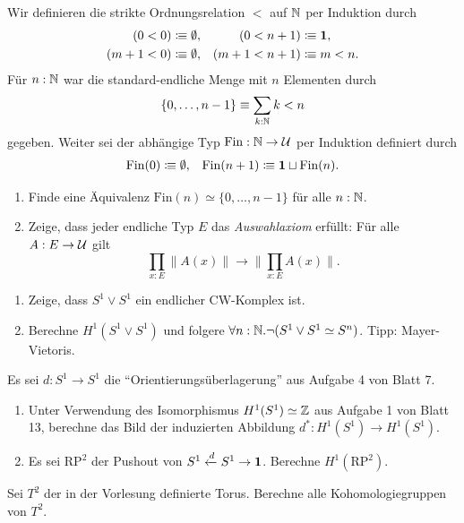 \documentclass{hott-übung}
\begin{document}
\setcounter{blattnummer}{14}
\setcounter{aufgabennummer}{0}

\blatt

\aufgabe{}
Wir definieren die strikte Ordnungsrelation \(<\) auf \(\mathbb{N}\) per Induktion durch
\begin{align*}
  (0 < 0) &\vcentcolon\mspace{-1.2mu}\equiv \emptyset, & (0 < n + 1) &\vcentcolon\mspace{-1.2mu}\equiv \mathbf{1}, \\
  (m + 1 < 0) &\vcentcolon\mspace{-1.2mu}\equiv \emptyset, & (m + 1 < n + 1) &\vcentcolon\mspace{-1.2mu}\equiv m < n.
\end{align*}
Für \(n : \mathbb{N}\) war die standard-endliche Menge mit \(n\) Elementen durch
\[\{0,\dots,n-1\} \equiv \sum_{k : \mathbb{N}} k < n\]
gegeben. Weiter sei der abhängige Typ \(\mathrm{Fin} : \mathbb{N} \to \mathcal{U}\) per Induktion definiert durch
\begin{align*}
\mathrm{Fin}(0) \vcentcolon\mspace{-1.2mu}\equiv \emptyset, && \mathrm{Fin}(n+1) \vcentcolon\mspace{-1.2mu}\equiv \mathbf{1} \sqcup \mathrm{Fin}(n).
\end{align*}
\begin{enumerate}
  \item
    Finde eine Äquivalenz \(\mathrm{Fin}(n) \simeq \{0,\dots,n-1\}\) für alle \(n : \mathbb{N}\).
  \item
    Zeige, dass jeder endliche Typ \(E\) das \emph{Auswahlaxiom} erfüllt:
    Für alle \(A : E \to \mathcal{U}\) gilt
    \[\prod_{x:E}\|A(x)\| \to \|\prod_{x:E}A(x)\|.\]
\end{enumerate}

\aufgabe{}
\begin{enumerate}
\item Zeige, dass \(S^1\vee S^1\) ein endlicher CW-Komplex ist.
\item Berechne \(H^1(S^1\vee S^1)\) und folgere \(\forall n:\mathbb{N}.\neg (S^1\vee S^1\simeq S^n)\).
  {\tiny Tipp: Mayer-Vietoris.}
\end{enumerate}

\aufgabe{}
Es sei \(d : S^1 \to S^1\) die \enquote{Orientierungsüberlagerung} aus Aufgabe 4 von Blatt 7.
\begin{enumerate}
  \item Unter Verwendung des Isomorphismus \(H^1(S^1) \simeq \mathbb{Z}\) aus Aufgabe 1 von Blatt 13, berechne das Bild der induzierten Abbildung \(d^* : H^1(S^1) \to H^1(S^1)\).
  \item Es sei \(\mathrm{RP}^2\) der Pushout von \(S^1 \xleftarrow{d} S^1 \to \mathbf{1}\).
    Berechne \(H^1(\mathrm{RP}^2)\).
\end{enumerate}

\aufgabe{}
Sei \(T^2\) der in der Vorlesung definierte Torus.
Berechne alle Kohomologiegruppen von \(T^2\).
\end{document}
